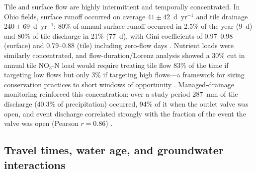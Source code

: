 Tile and surface flow are highly intermittent and temporally concentrated. In Ohio fields, surface runoff occurred on average $41\pm42$~d~yr$^{-1}$ and tile drainage $240\pm69$~d~yr$^{-1}$; 80\% of annual surface runoff occurred in 2.5\% of the year (9~d) and 80\% of tile discharge in 21\% (77~d), with Gini coefficients of 0.97--0.98 (surface) and 0.79--0.88 (tile) including zero-flow days \parencite{Williams2018}. Nutrient loads were similarly concentrated, and flow-duration/Lorenz analysis showed a 30\% cut in annual tile NO$_3$-N load would require treating tile flow 83\% of the time if targeting low flows but only 3\% if targeting high flows---a framework for sizing conservation practices to short windows of opportunity \parencite{Williams2018}. Managed-drainage monitoring reinforced this concentration: over a study period 287~mm of tile discharge (40.3\% of precipitation) occurred, 94\% of it when the outlet valve was open, and event discharge correlated strongly with the fraction of the event the valve was open (Pearson $r=0.86$) \parencite{Miller2022}.

\subsection{Travel times, water age, and groundwater interactions}

